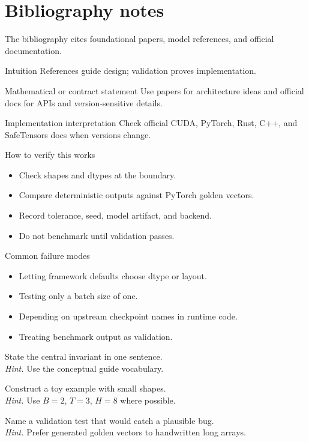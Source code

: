 \chapter{Bibliography notes}
\label{app:bib-notes}
The bibliography cites foundational papers, model references, and official documentation.



\begin{intuitionbox}{Intuition}
References guide design; validation proves implementation.
\end{intuitionbox}

\begin{definitionbox}{Mathematical or contract statement}
Use papers for architecture ideas and official docs for APIs and version-sensitive details.
\end{definitionbox}

\begin{implementationbox}{Implementation interpretation}
Check official CUDA, PyTorch, Rust, C++, and SafeTensors docs when versions change.
\end{implementationbox}

\begin{verificationbox}{How to verify this works}
\begin{itemize}
\item Check shapes and dtypes at the boundary.
\item Compare deterministic outputs against PyTorch golden vectors.
\item Record tolerance, seed, model artifact, and backend.
\item Do not benchmark until validation passes.
\end{itemize}
\end{verificationbox}

\begin{warningbox}{Common failure modes}
\begin{itemize}
\item Letting framework defaults choose dtype or layout.
\item Testing only a batch size of one.
\item Depending on upstream checkpoint names in runtime code.
\item Treating benchmark output as validation.
\end{itemize}
\end{warningbox}

\begin{chapterexercises}
\item State the central invariant in one sentence.\\
\textit{Hint.} Use the conceptual guide vocabulary.
\item Construct a toy example with small shapes.\\
\textit{Hint.} Use $B=2$, $T=3$, $H=8$ where possible.
\item Name a validation test that would catch a plausible bug.\\
\textit{Hint.} Prefer generated golden vectors to handwritten long arrays.
\end{chapterexercises}
